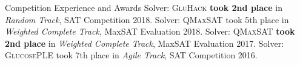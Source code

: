 \begin{rubric}{Competition Experience and Awards}
\entry*[2018] Solver: \textsc{GluHack} \textbf{took 2nd place} in \emph{Random Track}, SAT Competition 2018.
\entry*[2018] Solver: \textsc{QMaxSAT} took 5th place in \emph{Weighted Complete Track}, MaxSAT Evaluation 2018.
\entry*[2017] Solver: \textsc{QMaxSAT} \textbf{took 2nd place} in \emph{Weighted Complete Track}, MaxSAT Evaluation 2017.
\entry*[2016] Solver: \textsc{GlucosePLE} took 7th place in \emph{Agile Track}, SAT Competition 2016.
\end{rubric}

